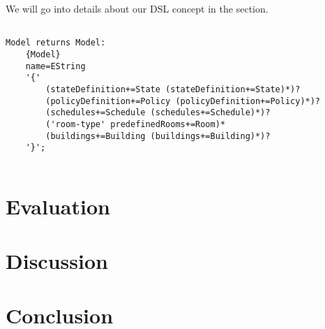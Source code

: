 \documentclass{llncs}
\begin{document}
We will go into details about our DSL concept in the  section.

\begin{lstlisting}[language=Xtext, caption={Just a test}, label={lst:Test}]

Model returns Model:
	{Model}
	name=EString
	'{'
		(stateDefinition+=State (stateDefinition+=State)*)?
		(policyDefinition+=Policy (policyDefinition+=Policy)*)?
		(schedules+=Schedule (schedules+=Schedule)*)?
		('room-type' predefinedRooms+=Room)*
		(buildings+=Building (buildings+=Building)*)?
	'}';


\end{lstlisting}

\section{Evaluation}\label{sec:evaluation}

\section{Discussion}\label{sec:discussion}

\section{Conclusion}\label{sec:conclusion}

{}

\end{document}
